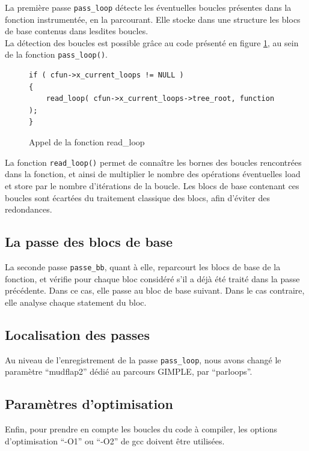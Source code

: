 La première passe \verb#pass_loop# détecte les éventuelles boucles présentes dans la fonction instrumentée, en la parcourant. Elle stocke dans une structure les blocs de base contenus dans lesdites boucles.\\

La détection des boucles est possible grâce au code présenté en figure \ref{fig:pass_loop}, au sein de la fonction \verb#pass_loop()#.\\

\begin{figure}[here]
  \centering
\begin{verbatim}
if ( cfun->x_current_loops != NULL )
{
    read_loop( cfun->x_current_loops->tree_root, function );
}
\end{verbatim}
  \caption{Appel de la fonction read\_loop}
  \label{fig:pass_loop}
\end{figure}

La fonction \verb#read_loop()# permet de connaître les bornes des boucles rencontrées dans la fonction, et ainsi de multiplier le nombre des opérations éventuelles load et store par le nombre d'itérations de la boucle. Les blocs de base contenant ces boucles sont écartées du traitement classique des blocs, afin d'éviter des redondances.

\subsection{La passe des blocs de base}

La seconde passe \verb#passe_bb#, quant à elle, reparcourt les blocs de base de la fonction, et vérifie pour chaque bloc considéré s'il a déjà été traité dans la passe précédente. Dans ce cas, elle passe au bloc de base suivant. Dans le cas contraire, elle analyse chaque statement du bloc.

\subsection{Localisation des passes}

Au niveau de l'enregistrement de la passe \verb#pass_loop#, nous avons changé le paramètre ``mudflap2'' dédié au parcours GIMPLE, par ``parloops''.

\subsection{Paramètres d'optimisation}

Enfin, pour prendre en compte les boucles du code à compiler, les options d'optimisation ``-O1'' ou ``-O2'' de gcc doivent être utilisées.

